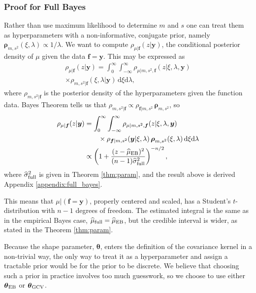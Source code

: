 \documentclass[twocolumn]{svjour3}          %
\newcommand{\bm}[1]{\boldsymbol{#1}}
\newcommand{\D}[1]{\text{d}{#1}}
\newcommand{\vtheta}{{\bm{\theta}}}
\newcommand{\vf}{\bm{f}}
\newcommand{\vrho}{\bm{\rho}}
\newcommand{\vy}{\bm{y}}
\newcommand{\hmu}{\widehat{\mu}}
\newcommand{\hsigma}{\widehat{\sigma}}
\newcommand{\MLE}{\textup{EB}}
\newcommand{\GCV}{\textup{GCV}}
\begin{document}
\subsubsection{Proof for Full Bayes} \label{sec:fullBayes}
Rather than use maximum likelihood to determine $m$ and $s$ one can treat them as hyperparameters with a non-informative, conjugate prior, namely $\vrho_{m,s^2}(\xi, \lambda) \propto 1/\lambda$. We want to compute $\rho_{\mu|\vf}(z | \vy)$, the conditional posterior density of $\mu$ given the data $\vf = \vy$.  This may be expressed as 
\begin{multline*}
    \rho_{\mu|\vf}(z | \vy) 
= \int_{0}^\infty \int_{-\infty}^\infty 
\rho_{\mu | m, s^2, \vf}(z | \xi, \lambda , \vy) \\
\times  \rho_{m, s^2 | \vf}(\xi, \lambda | \vy)  \, \D \xi \D \lambda, 
\end{multline*}
where $\rho_{m, s^2 | \vf}$ is the posterior density of the hyperparameters given the function data. Bayes Theorem tells us that $\rho_{m, s^2 | \vf} \propto \rho_{\vf | m, s^2} \, \vrho_{m,s^2}$, so 
\begin{align}
\nonumber 
    \rho_{\mu|\vf}(z | \vy) 
& = \int_{0}^\infty \int_{-\infty}^\infty 
\rho_{\mu | m, s^2, \vf}(z | \xi, \lambda , \vy) \\
\nonumber
& \qquad \times  \rho_{\vf | m, s^2} (\vy | \xi, \lambda) \, \vrho_{m,s^2}(\xi,\lambda)  \, \D \xi \D \lambda \\
\nonumber
& \propto \left( 1 +  \frac{(z - \hmu_{\MLE})^2}{(n-1) \hsigma_{\textup{full}}^2} \right)^{-n/2},
\end{align}
where $\hsigma_{\textup{full}}^2$ is given in Theorem \ref{thm:param}, and the result above is derived Appendix \ref{appendix:full_bayes}.

This means that $\mu \vert (\vf = \vy )$, properly centered and scaled, has a Student's $t$-distribution with $n-1$ degrees of freedom.   The estimated integral is the same as in the empirical Bayes case, $\hmu_{\textup{full}} = \hmu_{\MLE}$, but the credible interval is wider, as stated in the Theorem \ref{thm:param}.

Because the shape parameter, $\vtheta$, enters the definition of the covariance kernel in a non-trivial way, the only way to treat it as a hyperparameter and assign a tractable prior would be for the prior to be discrete.  We believe that choosing such a prior in practice involves too much guesswork, so we choose to use either $\vtheta_\MLE$ or $\vtheta_\GCV$.
\end{document}
